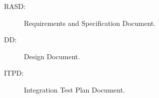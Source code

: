 \begin{description}
\item[RASD:] Requirements and Specification Document.
\item[DD:] Design Document.
\item[ITPD:] Integration Test Plan Document.
\end{description}